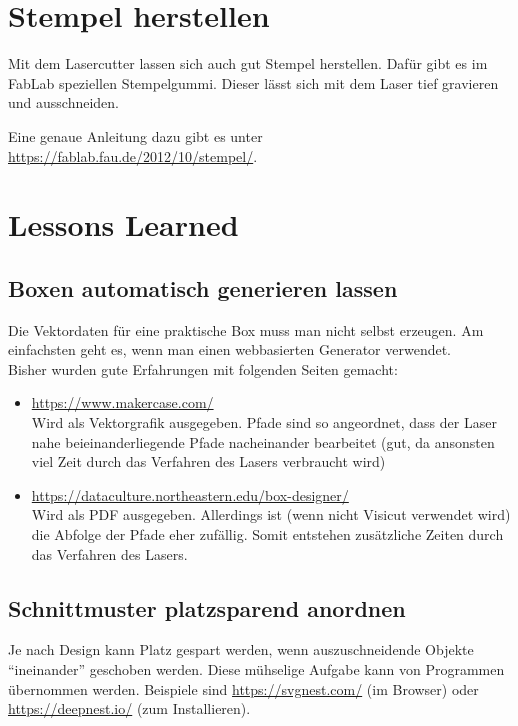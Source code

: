 \documentclass{\basedir/fablab-document}
\begin{document}
	\section{Stempel herstellen}
	\label{stempel}
	Mit dem Lasercutter lassen sich auch gut Stempel herstellen.
	Dafür gibt es im FabLab speziellen Stempelgummi.
	Dieser lässt sich mit dem Laser tief gravieren und ausschneiden.

	Eine genaue Anleitung dazu gibt es unter \url{https://fablab.fau.de/2012/10/stempel/}.

	\section{Lessons Learned}

	\subsection{Boxen automatisch generieren lassen}

	Die Vektordaten für eine praktische Box muss man nicht selbst erzeugen. Am einfachsten geht es, wenn man einen webbasierten Generator verwendet. \\

	Bisher wurden gute Erfahrungen mit folgenden Seiten gemacht:
	\begin{itemize}
		\item \url{https://www.makercase.com/} \\
		Wird als Vektorgrafik ausgegeben. Pfade sind so angeordnet, dass der Laser nahe beieinanderliegende Pfade nacheinander bearbeitet (gut, da ansonsten viel Zeit durch das Verfahren des Lasers verbraucht wird)
		\item \url{https://dataculture.northeastern.edu/box-designer/} \\
		Wird als PDF ausgegeben. Allerdings ist (wenn nicht Visicut verwendet wird) die Abfolge der Pfade eher zufällig. Somit entstehen zusätzliche Zeiten durch das Verfahren des Lasers.
	\end{itemize}


	\subsection{Schnittmuster platzsparend anordnen}
	Je nach Design kann Platz gespart werden, wenn auszuschneidende Objekte
	\enquote{ineinander} geschoben werden.
	Diese mühselige Aufgabe kann von Programmen übernommen werden.
	Beispiele sind \url{https://svgnest.com/} (im Browser) oder \url{https://deepnest.io/} (zum Installieren).
\end{document}
